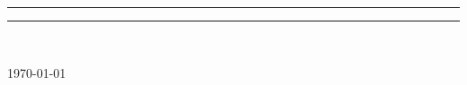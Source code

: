 \begin{titlepage}
\hspace*{-1cm}\begin{minipage}[t]{5cm}
\vspace{0pt}
\textcolor{whoblue!15}{\rule{5cm}{0.59\textheight}}
\end{minipage}
\hspace*{1cm}\begin{minipage}[t]{10cm}
\vspace{0pt}
\textcolor{whoblue}{\rule{10cm}{0.5mm}}\\[0.561\textheight]
\begin{flushright}
\cleanlookdateon \textsc{\LARGE \today}
\end{flushright}
\end{minipage}

\end{titlepage}
\restoregeometry
